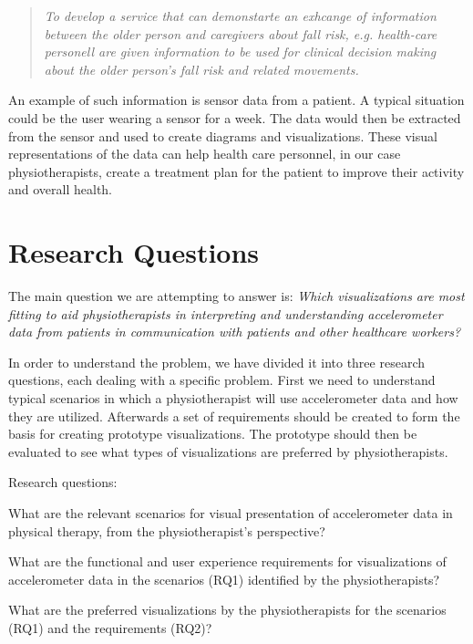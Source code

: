 \begin{quote}
\textit{To develop a service that can demonstarte an exhcange of information between the older person and caregivers about fall risk, e.g. health-care personell are given information to be used for clinical decision making about the older person's fall risk and related movements.}
\end{quote}

An example of such information is sensor data from a patient. A typical situation could be the user wearing a sensor for a week. The data would then be extracted from the sensor and used to create diagrams and visualizations. These visual representations of the data can help health care personnel, in our case physiotherapists, create a treatment plan for the patient to improve their activity and overall health. 

\section{Research Questions}
\label{sec:researchQuestions}
The main question we are attempting to answer is: \textit{Which visualizations are most fitting to aid physiotherapists in interpreting and understanding accelerometer data from patients in communication with patients and other healthcare workers?}

In order to understand the problem, we have divided it into three research questions, each dealing with a specific problem. First we need to understand typical scenarios in which a physiotherapist will use accelerometer data and how they are utilized. Afterwards a set of requirements should be created to form the basis for creating prototype visualizations. The prototype should then be evaluated to see what types of visualizations are preferred by physiotherapists.

Research questions:
\vspace{-15pt}
\begin{description}[parsep=0pt, itemsep=0pt]
\item[Research Question 1:] What are the relevant scenarios for visual presentation of accelerometer data in physical therapy, from the physiotherapist's perspective?

\item[Research Question 2:] What are the functional and user experience requirements for visualizations of accelerometer data in the scenarios (RQ1) identified by the physiotherapists?

\item[Research Question 3:] What are the preferred visualizations by the physiotherapists for the scenarios (RQ1) and the requirements (RQ2)?
\end{description}

